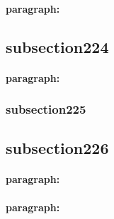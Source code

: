 \paragraph{paragraph:}
\lipsum[1]

\subsection{subsection224}\label{subsection224}
\lipsum[1]
\paragraph{paragraph:}
\lipsum[1-3]

\subsubsection{subsection225}\label{subsection225}
\lipsum[1]

\subsection{subsection226}\label{subsection226}
\lipsum[1-2]
\paragraph{paragraph:}
\lipsum[1]
\paragraph{paragraph: }
\lipsum[1]

